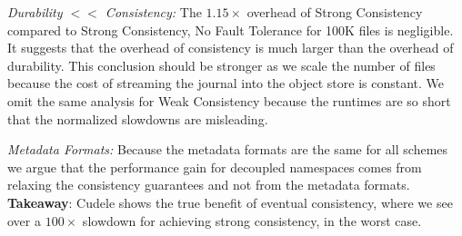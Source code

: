 {\it Durability \(<<\) Consistency:} The \(1.15\times\) overhead of
Strong Consistency compared to Strong Consistency, No Fault Tolerance for
100K files is negligible. It suggests that the overhead of consistency is much
larger than the overhead of durability. This conclusion should be stronger as
we scale the number of files because the cost of streaming the journal into the
object store is constant. We omit the same analysis for Weak Consistency
because the runtimes are so short that the normalized slowdowns are misleading.

{\it Metadata Formats:} Because the metadata formats are the same for
all schemes we argue that the performance gain for decoupled namespaces comes
from relaxing the consistency guarantees and not from the metadata formats.\\

\noindent\textbf{Takeaway}: Cudele shows the true benefit of eventual
consistency, where we see over a \(100\times\) slowdown for achieving strong
consistency, in the worst case.

